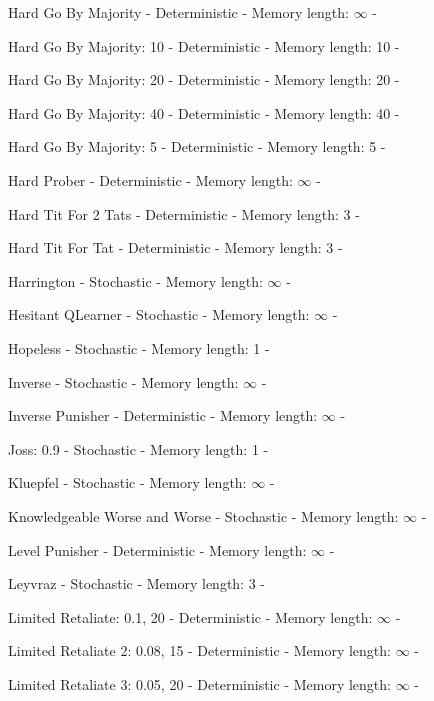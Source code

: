 \item Hard Go By Majority - Deterministic - Memory length: \(\infty\) - \cite{Mittal2009}
\item Hard Go By Majority: 10 - Deterministic - Memory length: 10 - \cite{Knight2018}
\item Hard Go By Majority: 20 - Deterministic - Memory length: 20 - \cite{Knight2018}
\item Hard Go By Majority: 40 - Deterministic - Memory length: 40 - \cite{Knight2018}
\item Hard Go By Majority: 5 - Deterministic - Memory length: 5 - \cite{Knight2018}
\item Hard Prober - Deterministic - Memory length: \(\infty\) - \cite{Prison1998}
\item Hard Tit For 2 Tats - Deterministic - Memory length: 3 - \cite{Stewart2012}
\item Hard Tit For Tat - Deterministic - Memory length: 3 - \cite{PD2017}
\item Harrington - Stochastic - Memory length: \(\infty\) - \cite{Axelrod1980b}
\item Hesitant QLearner - Stochastic - Memory length: \(\infty\) - \cite{Knight2018}
\item Hopeless - Stochastic - Memory length: 1 - \cite{Berg2015}
\item Inverse - Stochastic - Memory length: \(\infty\) - \cite{Knight2018}
\item Inverse Punisher - Deterministic - Memory length: \(\infty\) - \cite{Knight2018}
\item Joss: 0.9 - Stochastic - Memory length: 1 - \cite{Stewart2012, Axelrod1980}
\item Kluepfel - Stochastic - Memory length: \(\infty\) - \cite{Axelrod1980b}
\item Knowledgeable Worse and Worse - Stochastic - Memory length: \(\infty\) - \cite{Knight2018}
\item Level Punisher - Deterministic - Memory length: \(\infty\) - \cite{Eckhart2015}
\item Leyvraz - Stochastic - Memory length: 3 - \cite{Axelrod1980b}
\item Limited Retaliate: 0.1, 20 - Deterministic - Memory length: \(\infty\) - \cite{Knight2018}
\item Limited Retaliate 2: 0.08, 15 - Deterministic - Memory length: \(\infty\) - \cite{Knight2018}
\item Limited Retaliate 3: 0.05, 20 - Deterministic - Memory length: \(\infty\) - \cite{Knight2018}
